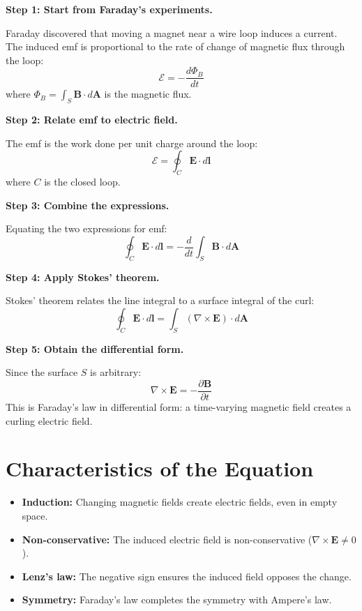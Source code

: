 \textbf{Step 1: Start from Faraday's experiments.}

Faraday discovered that moving a magnet near a wire loop induces a current. The induced emf is proportional to the rate of change of magnetic flux through the loop:
\begin{equation}
\mathcal{E} = -\frac{d\Phi_B}{dt}
\end{equation}
where $\Phi_B = \int_S \mathbf{B} \cdot d\mathbf{A}$ is the magnetic flux.

\textbf{Step 2: Relate emf to electric field.}

The emf is the work done per unit charge around the loop:
\begin{equation}
\mathcal{E} = \oint_C \mathbf{E} \cdot d\mathbf{l}
\end{equation}
where $C$ is the closed loop.

\textbf{Step 3: Combine the expressions.}

Equating the two expressions for emf:
\begin{equation}
\oint_C \mathbf{E} \cdot d\mathbf{l} = -\frac{d}{dt}\int_S \mathbf{B} \cdot d\mathbf{A}
\end{equation}

\textbf{Step 4: Apply Stokes' theorem.}

Stokes' theorem relates the line integral to a surface integral of the curl:
\begin{equation}
\oint_C \mathbf{E} \cdot d\mathbf{l} = \int_S (\nabla \times \mathbf{E}) \cdot d\mathbf{A}
\end{equation}

\textbf{Step 5: Obtain the differential form.}

Since the surface $S$ is arbitrary:
\begin{equation}
\boxed{\nabla \times \mathbf{E} = -\frac{\partial \mathbf{B}}{\partial t}}
\end{equation}
This is Faraday's law in differential form: a time-varying magnetic field creates a curling electric field.

\section*{Characteristics of the Equation}

\begin{itemize}
\item \textbf{Induction:} Changing magnetic fields create electric fields, even in empty space.
\item \textbf{Non-conservative:} The induced electric field is non-conservative ($\nabla \times \mathbf{E} \neq 0$).
\item \textbf{Lenz's law:} The negative sign ensures the induced field opposes the change.
\item \textbf{Symmetry:} Faraday's law completes the symmetry with Ampere's law.
\end{itemize}

